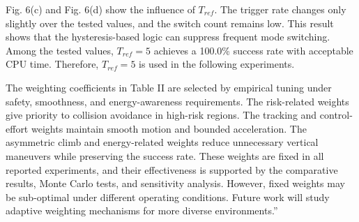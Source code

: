 \documentclass[12pt, twosides]{article}
\theoremstyle{definition}
\begin{document}
Fig. 6(c) and Fig. 6(d) show the influence of $T_{ref}$. The trigger rate changes only slightly over the tested values, and the switch count remains low. This result shows that the hysteresis-based logic can suppress frequent mode switching. Among the tested values, $T_{ref}=5$ achieves a 100.0\% success rate with acceptable CPU time. Therefore, $T_{ref}=5$ is used in the following experiments.

The weighting coefficients in Table II are selected by empirical tuning under safety, smoothness, and energy-awareness requirements. The risk-related weights give priority to collision avoidance in high-risk regions. The tracking and control-effort weights maintain smooth motion and bounded acceleration. The asymmetric climb and energy-related weights reduce unnecessary vertical maneuvers while preserving the success rate. These weights are fixed in all reported experiments, and their effectiveness is supported by the comparative results, Monte Carlo tests, and sensitivity analysis. However, fixed weights may be sub-optimal under different operating conditions. Future work will study adaptive weighting mechanisms for more diverse environments.''
\end{document}

